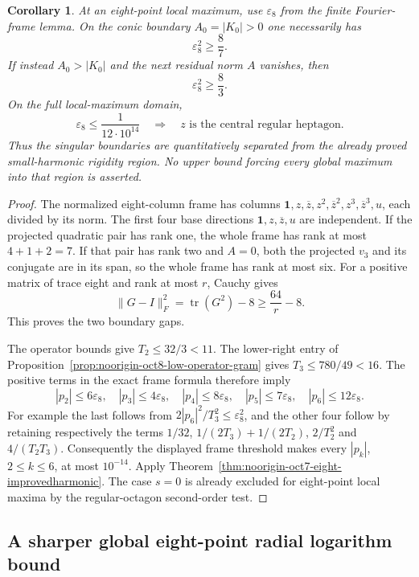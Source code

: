 \documentclass[11pt]{article}
\newtheorem{corollary}[theorem]{Corollary}
\theoremstyle{remark}
\numberwithin{equation}{section}
\begin{document}
\begin{corollary}\label{cor:noorigin-oct8-boundary-frame-gap}
At an eight-point local maximum, use $\varepsilon_8$ from the
finite Fourier-frame lemma. On the conic boundary
$A_0=|K_0|>0$ one necessarily has
\[
                         \varepsilon_8^2\ge\frac87.
\]
If instead $A_0>|K_0|$ and the next residual norm $A$ vanishes,
then
\[
                         \varepsilon_8^2\ge\frac83.
\]
On the full local-maximum domain,
\[
 \varepsilon_8\le\frac{1}{12\cdot10^{14}}
 \quad\Longrightarrow\quad
 z\text{ is the central regular heptagon}.
\]
Thus the singular boundaries are quantitatively separated from
the already proved small-harmonic rigidity region. No upper bound
forcing every global maximum into that region is asserted.
\end{corollary}
\begin{proof}
The normalized eight-column frame has columns
$\mathbf1,z,\overline z,z^2,\overline z^2,z^3,\overline z^3,u$,
each divided by its norm. The first four base directions
$\mathbf1,z,\overline z,u$ are independent. If the projected
quadratic pair has rank one, the whole frame has rank at most
$4+1+2=7$. If that pair has rank two and $A=0$, both the
projected $v_3$ and its conjugate are in its span, so the whole
frame has rank at most six. For a positive matrix of trace eight
and rank at most $r$, Cauchy gives
\[
 \|G-I\|_F^2=\operatorname{tr}(G^2)-8
                         \ge\frac{64}{r}-8.
\]
This proves the two boundary gaps.

The operator bounds give $T_2\le32/3<11$. The lower-right
entry of Proposition~\ref{prop:noorigin-oct8-low-operator-gram}
gives $T_3\le780/49<16$. The positive terms in the exact frame
formula therefore imply
\[
 |p_2|\le6\varepsilon_8,\quad
 |p_3|\le4\varepsilon_8,\quad
 |p_4|\le8\varepsilon_8,\quad
 |p_5|\le7\varepsilon_8,\quad
 |p_6|\le12\varepsilon_8.
\]
For example the last follows from
$2|p_6|^2/T_3^2\le\varepsilon_8^2$, and the other four follow
by retaining respectively the terms $1/32$,
$1/(2T_3)+1/(2T_2)$, $2/T_2^2$ and $4/(T_2T_3)$.
Consequently the displayed frame threshold makes every
$|p_k|$, $2\le k\le6$, at most $10^{-14}$. Apply
Theorem~\ref{thm:noorigin-oct7-eight-improvedharmonic}.
The case $s=0$ is already excluded for eight-point local maxima
by the regular-octagon second-order test.
\end{proof}

\subsection{A sharper global eight-point radial logarithm bound}
\label{sec:noorigin-oct8-eight-radial}
\end{document}
